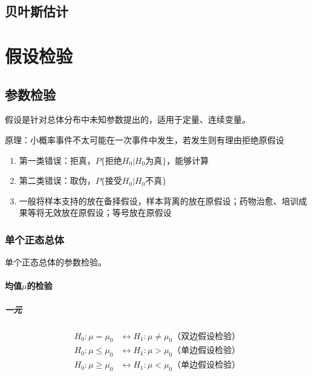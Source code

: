 \documentclass[12pt]{book}
\begin{document}
\section{贝叶斯估计}


\chapter{假设检验}





\section{参数检验}



假设是针对总体分布中未知参数提出的，适用于定量、连续变量。

原理：小概率事件不太可能在一次事件中发生，若发生则有理由拒绝原假设
\begin{enumerate}[(1)]
    \item 第一类错误：拒真，$P\{拒绝H_0|H_0为真\}$，能够计算
    \item 第二类错误：取伪，$P\{接受H_0|H_0不真\}$
    \item 一般将样本支持的放在备择假设，样本背离的放在原假设；药物治愈、培训成果等将无效放在原假设；等号放在原假设
\end{enumerate}






\subsection{单个正态总体}





单个正态总体的参数检验。


\subsubsection{均值$\mu$的检验}

\paragraph{一元}

\begin{align*}
    H_0: \mu = \mu_0    & \leftrightarrow  	H_1: \mu \neq  \mu_0 \text{（双边假设检验）} \\
    H_0: \mu \leq \mu_0 & \leftrightarrow  	H_1: \mu > \mu_0 \text{（单边假设检验）}     \\
    H_0: \mu \geq \mu_0 & \leftrightarrow  	H_1: \mu < \mu_0 \text{（单边假设检验）}
\end{align*}
\end{document}
